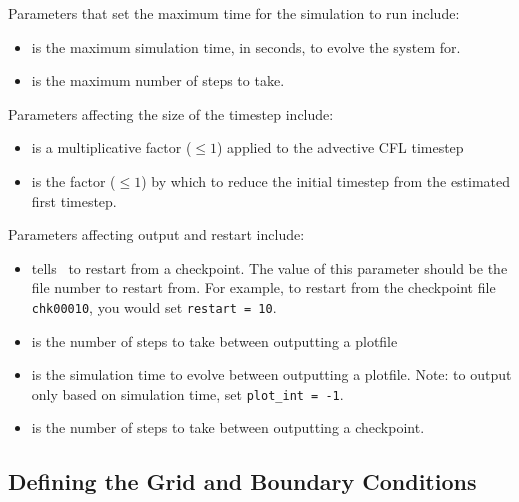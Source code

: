Parameters that set the maximum time for the simulation to run
include:
\begin{itemize}
\item {} is the maximum simulation time, in seconds,
      to evolve the system for.

\item {} is the maximum number of steps to take.
\end{itemize}

\noindent Parameters affecting the size of the timestep include:
\begin{itemize}
\item {} is a multiplicative factor ({\tt $\le 1$}) 
      applied to the advective CFL timestep

\item {} is the factor ({\tt $\le 1$}) by which to reduce 
      the initial timestep from the estimated first timestep.
\end{itemize}

\noindent Parameters affecting output and restart include:
\begin{itemize}

\item {} tells \maestro\ to restart from a checkpoint.  The
      value of this parameter should be the file number to restart from.
      For example, to restart from the checkpoint file {\tt chk00010},
      you would set {\tt restart = 10}.

\item {} is the number of steps to take between
  outputting a plotfile

\item {} is the simulation time to evolve between
  outputting a plotfile.  Note: to output only based on simulation
  time, set {\tt plot\_int = -1}.

\item {} is the number of steps to take between
  outputting a checkpoint.

\end{itemize}

\subsection{Defining the Grid and Boundary Conditions}

